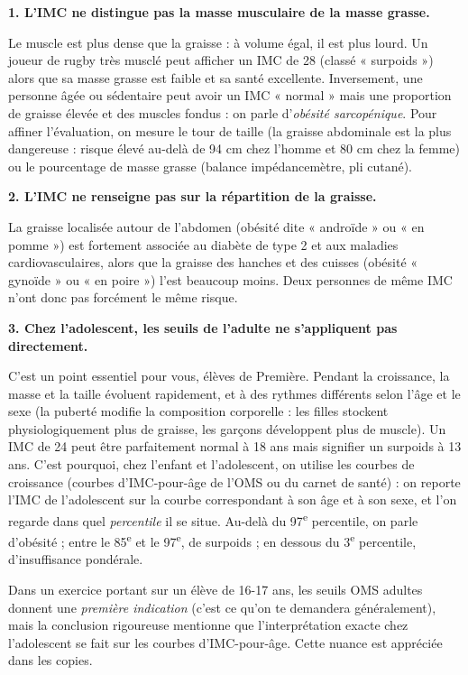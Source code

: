 \documentclass[11pt]{article}
\newcommand{\cle}[1]{{\popxbold\color{popdark}#1}}
\begin{document}
\textbf{1. L'IMC ne distingue pas la masse musculaire de la masse grasse.}\par

Le muscle est plus dense que la graisse : à volume égal, il est plus lourd. Un joueur de rugby très musclé peut afficher un IMC de 28 (classé « surpoids ») alors que sa masse grasse est faible et sa santé excellente. Inversement, une personne âgée ou sédentaire peut avoir un IMC « normal » mais une proportion de graisse élevée et des muscles fondus : on parle d'\emph{obésité sarcopénique}. Pour affiner l'évaluation, on mesure le \cle{tour de taille} (la graisse abdominale est la plus dangereuse : risque élevé au-delà de 94 cm chez l'homme et 80 cm chez la femme) ou le pourcentage de masse grasse (balance impédancemètre, pli cutané).

\textbf{2. L'IMC ne renseigne pas sur la répartition de la graisse.}\par

La graisse localisée autour de l'abdomen (obésité dite « androïde » ou « en pomme ») est fortement associée au diabète de type 2 et aux maladies cardiovasculaires, alors que la graisse des hanches et des cuisses (obésité « gynoïde » ou « en poire ») l'est beaucoup moins. Deux personnes de même IMC n'ont donc pas forcément le même risque.

\textbf{3. Chez l'adolescent, les seuils de l'adulte ne s'appliquent pas directement.}\par

C'est un point essentiel pour vous, élèves de Première. Pendant la croissance, la masse et la taille évoluent rapidement, et à des rythmes différents selon l'âge et le sexe (la puberté modifie la composition corporelle : les filles stockent physiologiquement plus de graisse, les garçons développent plus de muscle). Un IMC de 24 peut être parfaitement normal à 18 ans mais signifier un surpoids à 13 ans. C'est pourquoi, chez l'enfant et l'adolescent, on utilise les \cle{courbes de croissance} (courbes d'IMC-pour-âge de l'OMS ou du carnet de santé) : on reporte l'IMC de l'adolescent sur la courbe correspondant à son âge et à son sexe, et l'on regarde dans quel \emph{percentile} il se situe. Au-delà du 97\textsuperscript{e} percentile, on parle d'obésité ; entre le 85\textsuperscript{e} et le 97\textsuperscript{e}, de surpoids ; en dessous du 3\textsuperscript{e} percentile, d'insuffisance pondérale.

\begin{attention}
Dans un exercice portant sur un élève de 16-17 ans, les seuils OMS adultes donnent une \emph{première indication} (c'est ce qu'on te demandera généralement), mais la conclusion rigoureuse mentionne que l'interprétation exacte chez l'adolescent se fait sur les courbes d'IMC-pour-âge. Cette nuance est appréciée dans les copies.
\end{attention}
\end{document}
